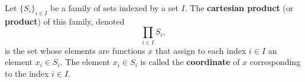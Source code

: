 Let $\{S_i\}_{i \in I}$ be a family of sets indexed by a set $I$. The \textbf{cartesian product} (or \textbf{product}) of this family, denoted
\[
\prod_{i \in I} S_i,
\]
is the set whose elements are functions $x$ that assign to each index $i \in I$ an element $x_i \in S_i$. The element $x_i \in S_i$ is called the \textbf{coordinate} of $x$ corresponding to the index $i \in I$.
